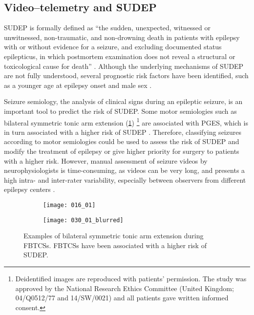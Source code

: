 \subsection{Video--telemetry and SUDEP}

\acs{SUDEP} is formally defined as ``the sudden, unexpected, witnessed or unwitnessed, non-traumatic, and non-drowning death in patients with epilepsy with or without evidence for a seizure, and excluding documented status epilepticus, in which postmortem examination does not reveal a structural or toxicological cause for death'' \cite{nashef_sudden_1997}.
Although the underlying mechanisms of \ac{SUDEP} are not fully understood, several prognostic risk factors have been identified, such as a younger age at epilepsy onset and male sex \cite{so_what_2008,jha_sudden_2021}.

Seizure semiology, the analysis of clinical signs during an epileptic seizure, is an important tool to predict the risk of \ac{SUDEP}.
Some motor semiologies such as bilateral symmetric tonic arm extension (\cref{fig:decerebration})%
\footnote{Deidentified images are reproduced with patients' permission. The study was approved by the National Research Ethics Committee (United Kingdom; 04/Q0512/77 and 14/SW/0021) and all patients gave written informed consent.} %
are associated with \ac{PGES}, which is in turn associated with a higher risk of \ac{SUDEP} \cite{alexandre_risk_2015,vilella_association_2021}.
Therefore, classifying seizures according to motor semiologies could be used to assess the risk of \ac{SUDEP} and modify the treatment of epilepsy or give higher priority for surgery to patients with a higher risk.
However, manual assessment of seizure videos by neurophysiologists is time-consuming, as videos can be very long, and presents a high intra- and inter-rater variability, especially between observers from different epilepsy centers \cite{tufenkjian_seizure_2012}.

\begin{figure}
  \centering

  \begin{subfigure}{0.49\linewidth}
    \texttt{[image: 016\_01]}
  \end{subfigure}
  \begin{subfigure}{0.49\linewidth}
    \texttt{[image: 030\_01\_blurred]}
  \end{subfigure}
  \caption[Examples of bilateral symmetric tonic arm extension]{
    Examples of bilateral symmetric tonic arm extension during \acfp{FBTCS}.
    \Acp*{FBTCS} have been associated with a higher risk of \acf*{SUDEP}.
  }
  \label{fig:decerebration}
\end{figure}


